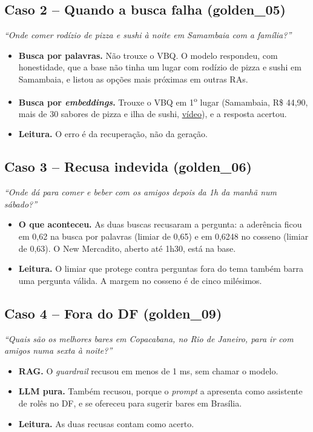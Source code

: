 \documentclass[11pt,a4paper]{article}
\begin{document}
\subsection{Caso 2 -- Quando a busca falha (golden\_05)}

\textit{``Onde comer rodízio de pizza e sushi à noite em Samambaia com a família?''}

\begin{itemize}
\item \textbf{Busca por palavras.} Não trouxe o VBQ. O modelo respondeu, com honestidade, que a base não tinha um lugar com rodízio de pizza e sushi em Samambaia, e listou as opções mais próximas em outras RAs.
\item \textbf{Busca por \textit{embeddings}.} Trouxe o VBQ em 1\textsuperscript{o} lugar (Samambaia, R\$ 44,90, mais de 30 sabores de pizza e ilha de sushi, \href{https://www.tiktok.com/@rolezandoembrasilia/video/7678112514009304338}{vídeo}), e a resposta acertou.
\item \textbf{Leitura.} O erro é da recuperação, não da geração.
\end{itemize}

\subsection{Caso 3 -- Recusa indevida (golden\_06)}

\textit{``Onde dá para comer e beber com os amigos depois da 1h da manhã num sábado?''}

\begin{itemize}
\item \textbf{O que aconteceu.} As duas buscas recusaram a pergunta: a aderência ficou em 0,62 na busca por palavras (limiar de 0,65) e em 0,6248 no cosseno (limiar de 0,63). O New Mercadito, aberto até 1h30, está na base.
\item \textbf{Leitura.} O limiar que protege contra perguntas fora do tema também barra uma pergunta válida. A margem no cosseno é de cinco milésimos.
\end{itemize}

\subsection{Caso 4 -- Fora do DF (golden\_09)}

\textit{``Quais são os melhores bares em Copacabana, no Rio de Janeiro, para ir com amigos numa sexta à noite?''}

\begin{itemize}
\item \textbf{RAG.} O \textit{guardrail} recusou em menos de 1 ms, sem chamar o modelo.
\item \textbf{LLM pura.} Também recusou, porque o \textit{prompt} a apresenta como assistente de rolês no DF, e se ofereceu para sugerir bares em Brasília.
\item \textbf{Leitura.} As duas recusas contam como acerto.
\end{itemize}
\end{document}
